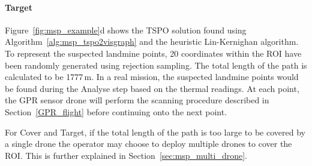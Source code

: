 \paragraph{Target} Figure~\ref{fig:msp_example}d shows the \gls{TSPO} solution found using Algorithm~\ref{alg:msp_tspo2visgraph} and the heuristic Lin-Kernighan algorithm. To represent the suspected landmine points, 20 coordinates within the \gls{ROI} have been randomly generated using rejection sampling. The total length of the path is calculated to be 1777\,m. In a real mission, the suspected landmine points would be found during the Analyse step based on the thermal readings. At each point, the \gls{GPR} sensor drone will perform the scanning procedure described in Section~\ref{GPR_flight} before continuing onto the next point. 

For Cover and Target, if the total length of the path is too large to be covered by a single drone the operator may choose to deploy multiple drones to cover the \gls{ROI}. This is further explained in Section~\ref{sec:msp_multi_drone}. 

